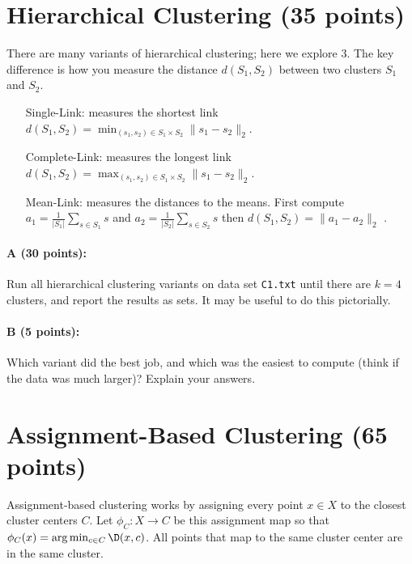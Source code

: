 \documentclass[11pt]{article}
\begin{document}
\section{Hierarchical Clustering (35 points)}

There are many variants of hierarchical clustering; here we explore $3$.  The key difference is how you measure the distance $d(S_1, S_2)$ between two clusters $S_1$ and $S_2$.  
\begin{itemize}
\item[\textsf{Single-Link: }] measures the shortest link $\displaystyle{d(S_1,S_2) = \min_{(s_1,s_2) \in S_1 \times S_2} \|s_1 - s_2\|_2}$. 

\item[\textsf{Complete-Link: }] measures the longest link $\displaystyle{d(S_1,S_2) = \max_{(s_1,s_2) \in S_1 \times S_2} \|s_1 - s_2\|_2}$. 

\item[\textsf{Mean-Link: }] measures the distances to the means.  First compute 
$a_1 = \frac{1}{|S_1|} \sum_{s \in S_1} s$ and 
$a_2 = \frac{1}{|S_2|} \sum_{s \in S_2} s$ then
$\displaystyle{d(S_1, S_2) = \|a_1 - a_2\|_2}$ .
\end{itemize}

\paragraph{A (30 points):}  
Run all hierarchical clustering variants on data set \texttt{C1.txt} until there are $k=4$ clusters, and report the results as sets.  
It may be useful to do this pictorially.  

\paragraph{B (5 points):}  
Which variant did the best job, and which was the easiest to compute (think if the data was much larger)?  
Explain your answers.  


\section{Assignment-Based Clustering (65 points)}

Assignment-based clustering works by assigning every point $x \in X$ to the closest cluster centers $C$.  Let $\phi_C : X \to C$ be this assignment map so that 
$\phi_C(x) = \arg \min_{c \in C} \D(x,c)$.  All points that map to the same cluster center are in the same cluster.  
\end{document}
